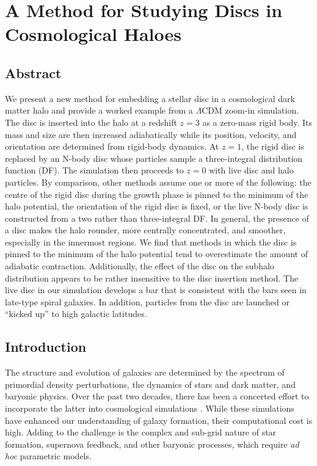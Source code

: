 \chapter{A Method for Studying Discs in Cosmological Haloes}

\section{Abstract}

We present a new method for embedding a stellar disc in a
cosmological dark matter halo and provide a worked example from a
$\Lambda$CDM zoom-in simulation.  The disc is inserted into the halo
at a redshift $z=3$ as a zero-mass rigid body.  Its mass and size
are then increased adiabatically while its position, velocity, and
orientation are determined from rigid-body dynamics.  At $z=1$,
the rigid disc is replaced by an N-body disc whose particles sample
a three-integral distribution function (DF).  The simulation then
proceeds to $z=0$ with live disc and halo particles.  By comparison,
other methods assume one or more of the following: the
centre of the rigid disc during the growth phase is pinned to the
minimum of the halo potential,  the orientation of the rigid disc is
fixed,  or the live N-body disc is constructed from a two rather than
three-integral DF.  In general, the presence of a disc makes the halo
rounder, more centrally concentrated, and smoother, especially in
the innermost regions.  We find that methods in which the disc is
pinned to the minimum of the halo potential tend to overestimate the
amount of adiabatic contraction.  Additionally, the effect of
the disc on the subhalo distribution appears to be rather insensitive
to the disc insertion method.  The live disc in our simulation
develops a bar that is consistent with the bars seen in late-type
spiral galaxies. In addition, particles from the disc are
launched or ``kicked up'' to high galactic latitudes.

\section{Introduction}

The structure and evolution of galaxies are determined by the spectrum
of primordial density perturbations, the dynamics of stars and dark
matter, and baryonic physics.  Over the past two decades, there has
been a concerted effort to incorporate the latter into cosmological
simulations \citep[e.g.][]{katz1996feedback, springel2003feedback,
  stinson2006, RoskarDiskMisalignment, pakmorMHD, gomezwarps}.  While
these simulations have enhanced our understanding of galaxy formation,
their computational cost is high.  Adding to the challenge is the
complex and sub-grid nature of star formation, supernova feedback, and
other baryonic processes, which require {\it ad hoc} parametric
models.

